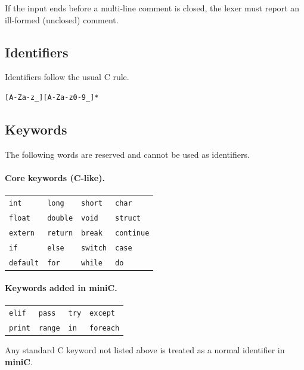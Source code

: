 \documentclass[11pt]{article}
\newcommand{\lang}{\textbf{miniC}}
\begin{document}
If the input ends before a multi-line comment is closed, the lexer must report an ill-formed (unclosed) comment.

\subsection{Identifiers}
Identifiers follow the usual C rule.
\begin{lstlisting}
[A-Za-z_][A-Za-z0-9_]*
\end{lstlisting}

\subsection{Keywords}
The following words are reserved and cannot be used as identifiers.

\paragraph{Core keywords (C-like).}
\begin{center}
\begin{tabular}{llll}
\toprule
	\texttt{int} & \texttt{long} & \texttt{short} & \texttt{char} \\
	\texttt{float} & \texttt{double} & \texttt{void} & \texttt{struct} \\
	\texttt{extern} & \texttt{return} & \texttt{break} & \texttt{continue} \\
	\texttt{if} & \texttt{else} & \texttt{switch} & \texttt{case} \\
	\texttt{default} & \texttt{for} & \texttt{while} & \texttt{do} \\
\bottomrule
\end{tabular}
\end{center}

\paragraph{Keywords added in \lang{}.}
\begin{center}
\begin{tabular}{llll}
\toprule
	\texttt{elif} & \texttt{pass} & \texttt{try} & \texttt{except} \\
	\texttt{print} & \texttt{range} & \texttt{in} & \texttt{foreach} \\
\bottomrule
\end{tabular}
\end{center}

Any standard C keyword not listed above is treated as a normal identifier in \lang{}.
\end{document}

